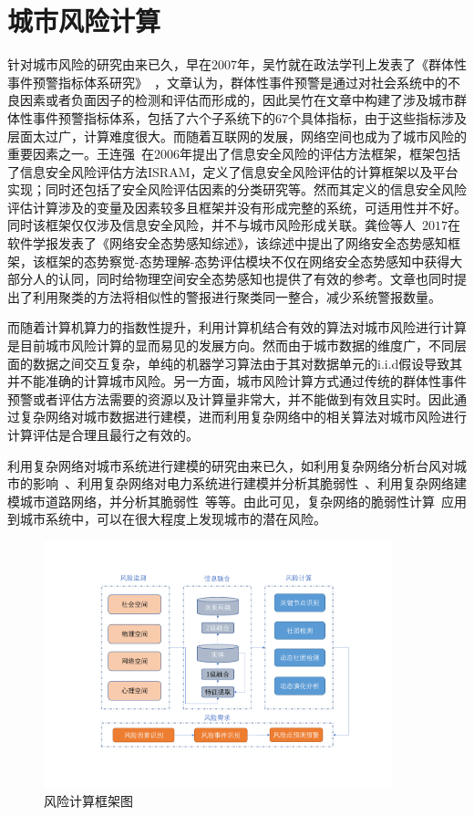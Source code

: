 \section{城市风险计算}

针对城市风险的研究由来已久，早在$2007$年，吴竹就在政法学刊上发表了《群体性事件预警指标体系研究》~\cite{wu2007group}，文章认为，群体性事件预警是通过对社会系统中的不良因素或者负面因子的检测和评估而形成的，因此吴竹在文章中构建了涉及城市群体性事件预警指标体系，包括了六个子系统下的$67$个具体指标，由于这些指标涉及层面太过广，计算难度很大。而随着互联网的发展，网络空间也成为了城市风险的重要因素之一。王连强~\cite{WangLianqiang2016message}在$2006$年提出了信息安全风险的评估方法框架，框架包括了信息安全风险评估方法ISRAM，定义了信息安全风险评估的计算框架以及平台实现；同时还包括了安全风险评估因素的分类研究等。然而其定义的信息安全风险评估计算涉及的变量及因素较多且框架并没有形成完整的系统，可适用性并不好。同时该框架仅仅涉及信息安全风险，并不与城市风险形成关联。龚俭等人~\cite{gongjian2017network}$2017$在软件学报发表了《网络安全态势感知综述》，该综述中提出了网络安全态势感知框架，该框架的态势察觉-态势理解-态势评估模块不仅在网络安全态势感知中获得大部分人的认同，同时给物理空间安全态势感知也提供了有效的参考。文章也同时提出了利用聚类的方法将相似性的警报进行聚类同一整合，减少系统警报数量。

而随着计算机算力的指数性提升，利用计算机结合有效的算法对城市风险进行计算是目前城市风险计算的显而易见的发展方向。然而由于城市数据的维度广，不同层面的数据之间交互复杂，单纯的机器学习算法由于其对数据单元的i.i.d假设导致其并不能准确的计算城市风险。另一方面，城市风险计算方式通过传统的群体性事件预警或者评估方法需要的资源以及计算量非常大，并不能做到有效且实时。因此通过复杂网络对城市数据进行建模，进而利用复杂网络中的相关算法对城市风险进行计算评估是合理且最行之有效的。

利用复杂网络对城市系统进行建模的研究由来已久，如利用复杂网络分析台风对城市的影响~\cite{chenchangkun2012taifeng}、利用复杂网络对电力系统进行建模并分析其脆弱性~\cite{2014electric}、利用复杂网络建模城市道路网络，并分析其脆弱性~\cite{zhangshude2014}等等。由此可见，复杂网络的脆弱性计算~\cite{gou2016topological}应用到城市系统中，可以在很大程度上发现城市的潜在风险。

\begin{figure}[htbp]
	\centering
	\includegraphics[width = 0.9\textwidth]{./figure/framework2.pdf}
	\caption{风险计算框架图}
	\label{fig.2}
\end{figure}

